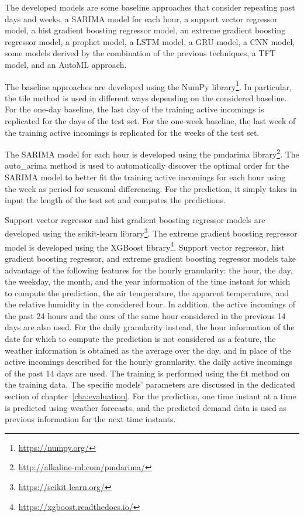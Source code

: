 The developed models are some baseline approaches that consider repeating past days and weeks, a SARIMA model for each hour, a support vector regressor model, a hist gradient boosting regressor model, an extreme gradient boosting regressor model, a prophet model, a LSTM model, a GRU model, a CNN model, some models derived by the combination of the previous techniques, a TFT model, and an AutoML approach.

The baseline approaches are developed using the NumPy library\footnote{ \url{https://numpy.org/} }.
In particular, the tile method is used in different ways depending on the considered baseline.
For the one-day baseline, the last day of the training active incomings is replicated for the days of the test set.
For the one-week baseline, the last week of the training active incomings is replicated for the weeks of the test set.

The SARIMA model for each hour is developed using the pmdarima library\footnote{ \url{http://alkaline-ml.com/pmdarima/} }.
The auto\_arima method is used to automatically discover the optimal order for the SARIMA model to better fit the training active incomings for each hour using the week as period for seasonal differencing.
For the prediction, it simply takes in input the length of the test set and computes the predictions.

Support vector regressor and hist gradient boosting regressor models are developed using the scikit-learn library\footnote{ \url{https://scikit-learn.org/} }.
The extreme gradient boosting regressor model is developed using the XGBoost library\footnote{ \url{https://xgboost.readthedocs.io/} }.
Support vector regressor, hist gradient boosting regressor, and extreme gradient boosting regressor models take advantage of the following features for the hourly granularity: the hour, the day, the weekday, the month, and the year information of the time instant for which to compute the prediction, the air temperature, the apparent temperature, and the relative humidity in the considered hour.
In addition, the active incomings of the past 24 hours and the ones of the same hour considered in the previous 14 days are also used.
For the daily granularity instead, the hour information of the date for which to compute the prediction is not considered as a feature, the weather information is obtained as the average over the day, and in place of the active incomings described for the hourly granularity, the daily active incomings of the past 14 days are used.
The training is performed using the fit method on the training data.
The specific models’ parameters are discussed in the dedicated section of chapter~\ref{cha:evaluation}.
For the prediction, one time instant at a time is predicted using weather forecasts, and the predicted demand data is used as previous information for the next time instants.

